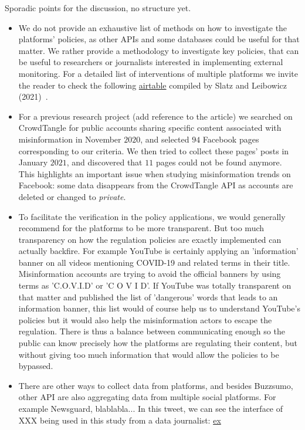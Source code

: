 \documentclass{article}
\begin{document}
{ \color{pink} 
Sporadic points for the discussion, no structure yet. 

\begin{itemize}

	\item We do not provide  an exhaustive list of methods on how to investigate the platforms’ policies, as other APIs and some databases could be useful for that matter. We rather provide a methodology to investigate key policies, that can be useful to researchers or journalists interested in implementing external monitoring. For a detailed list of interventions of multiple platforms we invite the reader to check the following \href{https://airtable.com/shrO0ooI9WSEfIUhb/tblAWQwFOiihKdQjm/viwZLAOzLK1NQ0c2n?blocks=hide}{airtable} compiled by Slatz and Leibowicz (2021)~\cite{niemanlab}.

	\item For a previous research project (add reference to the article) we searched on CrowdTangle for public accounts sharing specific content associated with misinformation in November $2020$, and selected $94$ Facebook pages corresponding to our criteria. We then tried to collect these pages' posts in January $2021$, and discovered that $11$ pages could not be found anymore. This highlights an important issue when studying misinformation trends on Facebook: some data disappears from the CrowdTangle API as accounts are deleted or changed to {\it private}. 

	\item To facilitate the verification in the policy applications, we would generally recommend for the platforms to be more transparent. But too much transparency on how the regulation policies are exactly implemented can actually backfire. For example YouTube is certainly applying an 'information' banner on all videos mentioning COVID-19 and related terms in their title. Misinformation accounts are trying to avoid the official banners by using terms as 'C.O.V.I.D' or 'C O V I D'. If YouTube was totally transparent on that matter and published the list of 'dangerous' words that leads to an information banner, this list would of course help us to understand YouTube's policies but it would also help the misinformation actors to escape the regulation. There is thus a balance between communicating enough so the public can know precisely how the platforms are regulating their content, but without giving too much information that would allow the policies to be bypassed.

	\item There are other ways to collect data from platforms, and besides Buzzsumo, other API are also aggregating data from multiple social platforms. For example Newsguard, blablabla... In this tweet, we can see the interface of XXX being used in this study from a data journalist: \href{https://twitter.com/Shayan86/status/1394742784683298818/photo/2}{ex}


\end{itemize}}
\end{document}
